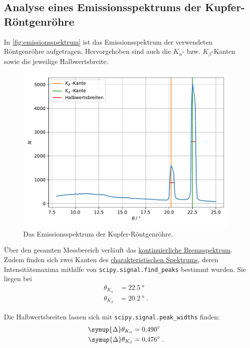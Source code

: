 \subsection{Analyse eines Emissionsspektrums der Kupfer-Röntgenröhre}
\label{sec:auswertung:emissionsspektrum}

In \autoref{fig:emissionsspektrum} ist das Emissionsspektrum der verwendeten Röntgenröhre aufgetragen.
Hervorgehoben sind auch die $K_\alpha$- bzw. $K_\beta$-Kanten
sowie die jeweilige Halbwertsbreite.

\begin{figure}
    \centering
    \includegraphics[width=\textwidth]{build/plot_emissionsspektrum.pdf}
    \caption{Das Emissionsspektrum der Kupfer-Röntgenröhre.}
    \label{fig:emissionsspektrum}
\end{figure}

Über den gesamten Messbereich verläuft das \hyperref[sec:theorie:bremsspektrum]{kontinuierliche Bremsspektrum}.
Zudem finden sich zwei Kanten des \hyperref[sec:theorie:char_spektrum]{charakteristischen Spektrums},
deren Intensitätsmaxima mithilfe von \texttt{scipy.signal.find\_peaks} bestimmt wurden.
Sie liegen bei
\begin{align*}
    \theta_{K_\alpha} &= \SI{22.5}{\degree} \\
    \theta_{K_\beta}  &= \SI{20.2}{\degree} \; .
\end{align*}


Die Halbwertsbreiten lassen sich mit \texttt{scipy.signal.peak\_widths} finden:
\begin{align*}
    \symup{\Delta}\theta_{K_\alpha} &= \SI{0.490}{\degree} \\
    \symup{\Delta}\theta_{K_\beta}  &= \SI{0.476}{\degree} \; .
\end{align*}


